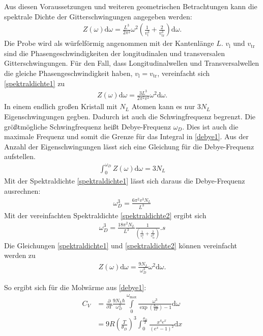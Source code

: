 Aus diesen Voraussetzungen und weiteren geometrischen Betrachtungen kann die spektrale Dichte der Gitterschwingungen angegeben werden:
\begin{align}
	\label{spektraldichte1}
	Z(\omega) \mathrm{d}\omega = \frac{L^3}{2 \pi^2} \omega^2 \left(\frac{1}{v_\mathrm{l}^3} + \frac{2}{v_\mathrm{tr}^3}\right)\mathrm{d}\omega.
\end{align}
Die Probe wird als würfelförmig angenommen mit der Kantenlänge $L$.
$v_\mathrm{l}$ und $v_\mathrm{tr}$ sind die Phasengeschwindigkeiten der longitudinalen und transversalen Gitterschwingungen.
Für den Fall, dass Longitudinalwellen und Transversalwellen die gleiche Phasengeschwindigkeit haben, $v_\mathrm{l} = v_\mathrm{tr}$, vereinfacht sich \eqref{spektraldichte1} zu
\begin{align}
	\label{spektraldichte2}
	Z(\omega)\mathrm{d}\omega = \frac{3L^3}{2 \pi^2v^3}\omega^2 \mathrm{d}\omega.
\end{align}
In einem endlich großen Kristall mit $N_L$ Atomen kann es nur $3N_L$ Eigenschwingungen gegben.
Dadurch ist auch die Schwingfrequenz begrenzt.
Die größtmögliche Schwingfrequenz heißt Debye-Frequenz $\omega_D$.
Dies ist auch die maximale Frequenz und somit die Grenze für das Integral in \eqref{debye1}.
Aus der Anzahl der Eigenschwingungen lässt sich eine Gleichung für die Debye-Frequenz aufstellen.
\begin{align}
	\label{debyeintegral}
	\int_{0}^{\omega_D}Z(\omega)\mathrm{d}\omega = 3N_L
\end{align}
Mit der Spektraldichte \eqref{spektraldichte1} lässt sich daraus die Debye-Frequenz ausrechnen:
\begin{align}
	\label{debyefreq}
	\omega_D^3 = \frac{6 \pi^2 v^3 N_L}{L^3}
\end{align}
Mit der vereinfachten Spektraldichte \eqref{spektraldichte2} ergibt sich
\begin{align}
	\omega_D^3 = \frac{18 \pi^2 N_L}{L^3} \frac{1}{\left(\frac{1}{v_\mathrm{l}^3} + \frac{2}{v_\mathrm{tr}^3}\right)}.s
\end{align}
Die Gleichungen \eqref{spektraldichte1} und \eqref{spektraldichte2} können vereinfacht werden zu
\begin{align}
	Z(\omega)\mathrm{d}\omega = \frac{9N_L}{\omega_D^3} \omega^2 \mathrm{d}\omega.
\end{align}

So ergibt sich für die Molwärme aus \eqref{debye1}:
\begin{align}
	C_V & = \frac{\partial}{\partial T}\frac{9N_L \hbar}{\omega_D^3}  \int\limits_{0}^{\omega_\mathrm{max}} \frac{\omega^3}{\exp \left( \frac{\hbar \omega}{kT} \right)-1} \mathrm{d}\omega \\
	& = 9R \left(\frac{T}{\theta_D}\right)^3 \int_0^\frac{\theta_D}{T} \frac{x^4 e^x}{\left(e^x - 1\right)^2} \mathrm{d}x
\end{align}

